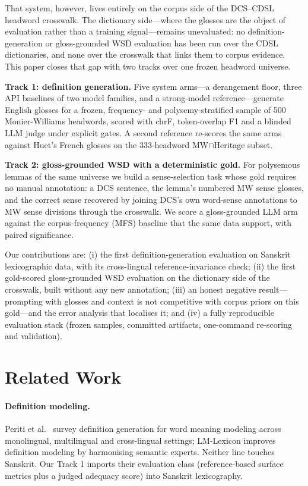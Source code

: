 \documentclass[11pt]{article}
\begin{document}
That system, however, lives entirely on the corpus side of the DCS--CDSL headword
crosswalk. The dictionary side---where the glosses are the object of evaluation rather
than a training signal---remains unevaluated: no definition-generation or
gloss-grounded WSD evaluation has been run over the CDSL dictionaries, and none over the
crosswalk that links them to corpus evidence. This paper closes that gap with two tracks
over one frozen headword universe.

\textbf{Track 1: definition generation.} Five system arms---a derangement floor, three
API baselines of two model families, and a strong-model reference---generate English
glosses for a frozen, frequency- and polysemy-stratified sample of 500 Monier-Williams
headwords, scored with chrF, token-overlap F1 and a blinded LLM judge under explicit
gates. A second reference re-scores the same arms against Huet's French glosses on the
333-headword MW$\cap$Heritage subset.

\textbf{Track 2: gloss-grounded WSD with a deterministic gold.} For polysemous lemmas of
the same universe we build a sense-selection task whose gold requires no manual
annotation: a DCS sentence, the lemma's numbered MW sense glosses, and the correct sense
recovered by joining DCS's own word-sense annotations to MW sense divisions through the
crosswalk. We score a gloss-grounded LLM arm against the corpus-frequency (MFS) baseline
that the same data support, with paired significance.

Our contributions are: (i) the first definition-generation evaluation on Sanskrit
lexicographic data, with its cross-lingual reference-invariance check; (ii) the first
gold-scored gloss-grounded WSD evaluation on the dictionary side of the crosswalk, built
without any new annotation; (iii) an honest negative result---prompting with glosses and
context is not competitive with corpus priors on this gold---and the error analysis that
localises it; and (iv) a fully reproducible evaluation stack (frozen samples, committed
artifacts, one-command re-scoring and validation).

\section{Related Work}

\paragraph{Definition modeling.} Periti et al.\ \cite{periti-etal-2025-definition}
survey definition generation for word meaning modeling across monolingual, multilingual
and cross-lingual settings; LM-Lexicon \cite{liu-etal-2026-lm} improves definition
modeling by harmonising semantic experts. Neither line touches Sanskrit. Our Track 1
imports their evaluation class (reference-based surface metrics plus a judged adequacy
score) into Sanskrit lexicography.
\end{document}
